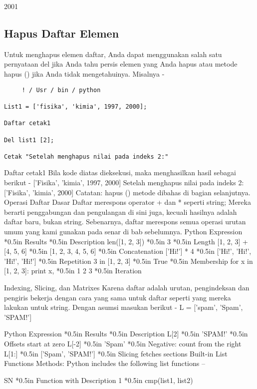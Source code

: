 2001 

\subsection{Hapus Daftar Elemen} 

Untuk menghapus elemen daftar, Anda dapat menggunakan salah satu pernyataan del jika Anda tahu persis elemen yang Anda hapus atau metode hapus () jika Anda tidak mengetahuinya. Misalnya - 

\begin{verbatim}
     ! / Usr / bin / python 

List1 = ['fisika', 'kimia', 1997, 2000]; 

Daftar cetak1 

Del list1 [2]; 

Cetak "Setelah menghapus nilai pada indeks 2:" 
\end{verbatim}

Daftar cetak1 
Bila kode diatas dieksekusi, maka menghasilkan hasil sebagai berikut - 
['Fisika', 'kimia', 1997, 2000] 
Setelah menghapus nilai pada indeks 2: 
['Fisika', 'kimia', 2000] 
Catatan: hapus () metode dibahas di bagian selanjutnya. 
Operasi Daftar Dasar 
Daftar merespons operator + dan * seperti string; Mereka berarti penggabungan dan pengulangan di sini juga, kecuali hasilnya adalah daftar baru, bukan string. 
Sebenarnya, daftar merespons semua operasi urutan umum yang kami gunakan pada senar di bab sebelumnya. 
Python Expression *{0.5in} Results  *{0.5in} Description 
len([1, 2, 3]) *{0.5in} 3 *{0.5in} Length 
[1, 2, 3] + [4, 5, 6] *{0.5in} [1, 2, 3, 4, 5, 6] *{0.5in} Concatenation 
['Hi!'] * 4 *{0.5in} ['Hi!', 'Hi!', 'Hi!', 'Hi!'] *{0.5in} Repetition 
3 in [1, 2, 3] *{0.5in} True *{0.5in} Membership 
for x in [1, 2, 3]: print x, *{0.5in} 1 2 3 *{0.5in} Iteration 

Indexing, Slicing, dan Matrixes 
Karena daftar adalah urutan, pengindeksan dan pengiris bekerja dengan cara yang sama untuk daftar seperti yang mereka lakukan untuk string. 
Dengan asumsi masukan berikut - 
L = ['spam', 'Spam', 'SPAM!'] 
  
Python Expression *{0.5in} Results  *{0.5in} Description 
L[2] *{0.5in} 'SPAM!' *{0.5in} Offsets start at zero 
L[-2] *{0.5in} 'Spam' *{0.5in} Negative: count from the right 
L[1:] *{0.5in} ['Spam', 'SPAM!'] *{0.5in} Slicing fetches sections 
Built-in List Functions       Methods: 
Python includes the following list functions – 

SN *{0.5in} Function with Description 
1 *{0.5in} cmp(list1, list2) 

